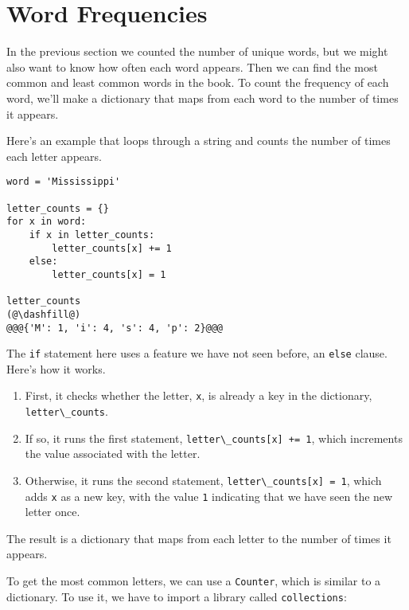 \hypertarget{word-frequencies}{%
\section{Word Frequencies}\label{word-frequencies}}

In the previous section we counted the number of unique words, but we
might also want to know how often each word appears. Then we can find
the most common and least common words in the book. To count the
frequency of each word, we'll make a dictionary that maps from each word
to the number of times it appears.

Here's an example that loops through a string and counts the number of
times each letter appears.

\begin{lstlisting}[]
word = 'Mississippi'

letter_counts = {}
for x in word:
    if x in letter_counts:
        letter_counts[x] += 1
    else:
        letter_counts[x] = 1
        
letter_counts
(@\dashfill@)
@@@{'M': 1, 'i': 4, 's': 4, 'p': 2}@@@
\end{lstlisting}

The \passthrough{\lstinline!if!} statement here uses a feature we have
not seen before, an \passthrough{\lstinline!else!} clause. Here's how it
works.

\begin{enumerate}
\def\labelenumi{\arabic{enumi}.}
\item
  First, it checks whether the letter, \passthrough{\lstinline!x!}, is
  already a key in the dictionary,
  \passthrough{\lstinline!letter\_counts!}.
\item
  If so, it runs the first statement,
  \passthrough{\lstinline!letter\_counts[x] += 1!}, which increments the
  value associated with the letter.
\item
  Otherwise, it runs the second statement,
  \passthrough{\lstinline!letter\_counts[x] = 1!}, which adds
  \passthrough{\lstinline!x!} as a new key, with the value
  \passthrough{\lstinline!1!} indicating that we have seen the new
  letter once.
\end{enumerate}

The result is a dictionary that maps from each letter to the number of
times it appears.

To get the most common letters, we can use a
\passthrough{\lstinline!Counter!}, which is similar to a dictionary. To
use it, we have to import a library called
\passthrough{\lstinline!collections!}:

